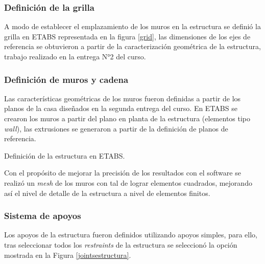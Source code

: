 
\newpage
\subsubsection{Definición de la grilla}

    A modo de establecer el emplazamiento de los muros en la estructura se definió la grilla en ETABS representada en la figura \ref{grid}, las dimensiones de los ejes de referencia se obtuvieron a partir de la caracterización geométrica de la estructura, trabajo realizado en la entrega N°2 del curso.
    
    

\newpage
\subsubsection{Definición de muros y cadena}
    
    Las características geométricas de los muros fueron definidas a partir de los planos de la casa diseñados en la segunda entrega del curso. En ETABS se crearon los muros a partir del plano en planta de la estructura (elementos tipo \textit{wall}), las extrusiones se generaron a partir de la definición de planos de referencia.
    
    \begin{images}{Definición de la estructura en ETABS.}
    \end{images}
    
    Con el propósito de mejorar la precisión de los resultados con el software se realizó un \textit{mesh} de los muros con tal de lograr elementos cuadrados, mejorando así el nivel de detalle de la estructura a nivel de elementos finitos.

\subsubsection{Sistema de apoyos}
    
    Los apoyos de la estructura fueron definidos utilizando apoyos simples, para ello, tras seleccionar todos los \textit{restraints} de la estructura se seleccionó la opción mostrada en la Figura \ref{jointsestructura}.
    
